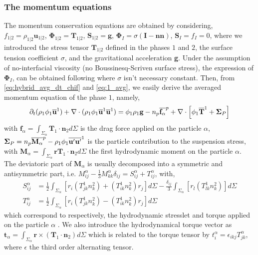 \subsubsection{The momentum equations}
The momentum conservation equations are obtained by considering, 
$f_{1|2} = \rho_{1|2} \textbf{u}_{1|2}$,           
$\mathbf{\Phi}_{1|2} = \textbf{T}_{1|2}$,
$\textbf{S}_{1|2} = \textbf{g}$, 
$\mathbf{\Phi}_I  =  \sigma (\textbf{I} - \textbf{nn})$,
$\mathbf{S}_I  =  f_I = 0$,
where we introduced the stress tensor $\textbf{T}_{1|2}$ defined in the phases $1$ and $2$, the surface tension coefficient $\sigma$, and the gravitational acceleration \textbf{g}.
Under the assumption of no-interfacial viscosity (no Boussinesq-Scriven surface stress), the expression of $\mathbf{\Phi}_I$, can be obtained following \citet[Chapter 2]{tryggvason2011direct}\citet{brenner2013interfacial} where $\sigma$ isn't necessary constant.  
Then, from \ref{eq:hybrid_avg_dt_chif} and \ref{eq:1_avg}, we easily derive the averaged momentum  equation of the phase $1$, namely, 
\begin{equation}
    \partial_t (\rho_1\phi_1\overline{\textbf{u}}^1)
    +  \mathbf{\nabla} \cdot (\rho_1\phi_1\overline{\textbf{u}}^1 \overline{\textbf{u}}^1)
    = 
     \phi_1 \rho_1 \textbf{g}
    - n_p\overline{\textbf{f}_\alpha}^{p}
    +  \mathbf{\nabla} \cdot \left[
        \phi_1\overline{ \textbf{T}}^1
        + \mathbf{\Sigma}_P
    \right]
    \label{eq:hybrid_avg_dt_rhou}
\end{equation}
with $\textbf{f}_\alpha = \int_{\Sigma_\alpha} \mathbf{T}_1 \cdot \textbf{n}_2d\Sigma$ is the drag force applied on the particle $\alpha$,
$\mathbf{\Sigma}_P = n_p\overline{\textbf{M}_\alpha}^{p} -  \rho_1\phi_1\overline{\textbf{u}'\textbf{u}'}^1$ is the particle contribution to the suspension stress,
with $\textbf{M}_\alpha = \int_{\Sigma_\alpha} \textbf{r}\mathbf{T}_1\cdot \textbf{n}_2d\Sigma $ the first hydrodynamic moment on the particle $\alpha$.
The deviatoric part of $\textbf{M}_\alpha$ is usually decomposed into a symmetric and antisymmetric part, i.e. $M^\alpha_{ij} - \frac{1}{3}M^\alpha_{kk}\delta_{ij} = S^\alpha_{ij}+T^\alpha_{ij}$, with,
\begin{align}
    \label{eq:M_decomposition}
    S^\alpha_{ij} 
    &= \frac{1}{2}  \int_{\Sigma_\alpha} \left[
        r_i(T^1_{jk}n^2_k)
        + (T^1_{ik}n^2_k)r_j
        \right]d\Sigma
        - \frac{\delta_{ij}}{3}\int_{\Sigma_\alpha} \left[
            r_l(T^1_{lk}n^2_k)
    \right]d\Sigma\\
    T^\alpha_{ij}
    &= \frac{1}{2}  \int_{\Sigma_\alpha} \left[
        r_i(T^1_{jk}n^2_k)
        - (T^1_{ik}n^2_k)r_j
    \right]d\Sigma \nonumber
\end{align}
which correspond  to respectively, the hydrodynamic stresslet and torque applied on the particle $\alpha$ \citep{guazzelli2011,kim2013microhydrodynamics}. 
We  also introduce the hydrodynamical torque vector as $\textbf{t}_\alpha = \int_{\Sigma_\alpha} \textbf{r} \times (\mathbf{T}_1\cdot \textbf{n}_2) d\Sigma$ which is related to the torque tensor by $t^\alpha_i = \epsilon_{ikj} T^\alpha_{jk}$, where $\epsilon$ the third order alternating tensor. 

